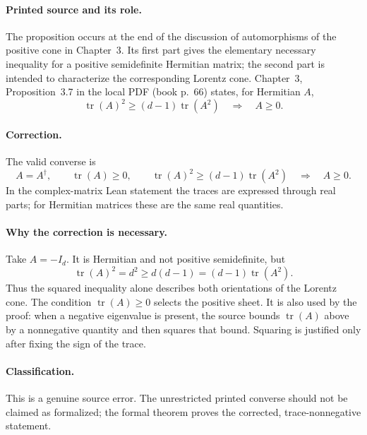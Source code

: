 \documentclass{article}
\begin{document}
\paragraph{Printed source and its role.}
The proposition occurs at the end of the discussion of automorphisms of the
positive cone in Chapter~3.  Its first part gives the elementary necessary
inequality for a positive semidefinite Hermitian matrix; the second part is
intended to characterize the corresponding Lorentz cone.  Chapter~3,
Proposition~3.7 in the local PDF (book p.~66) states, for Hermitian $A$,
\begin{equation}\tag{printed converse}
  \operatorname{tr}(A)^2\geq(d-1)\operatorname{tr}(A^2)
  \quad\Longrightarrow\quad A\geq0.
\end{equation}

\paragraph{Correction.}
The valid converse is
\begin{equation}\tag{formalized converse}
  A=A^\dagger,\qquad
  \operatorname{tr}(A)\geq0,\qquad
  \operatorname{tr}(A)^2\geq(d-1)\operatorname{tr}(A^2)
  \quad\Longrightarrow\quad A\geq0.
\end{equation}
In the complex-matrix Lean statement the traces are expressed through real
parts; for Hermitian matrices these are the same real quantities.

\paragraph{Why the correction is necessary.}
Take $A=-I_d$. It is Hermitian and not positive semidefinite, but
\begin{equation}
  \operatorname{tr}(A)^2=d^2
  \geq d(d-1)=(d-1)\operatorname{tr}(A^2).
\end{equation}
Thus the squared inequality alone describes both orientations of the Lorentz
cone. The condition $\operatorname{tr}(A)\geq0$ selects the positive sheet.
It is also used by the proof: when a negative eigenvalue is present, the source
bounds $\operatorname{tr}(A)$ above by a nonnegative quantity and then squares
that bound. Squaring is justified only after fixing the sign of the trace.

\paragraph{Classification.}
This is a genuine source error. The unrestricted printed converse should not
be claimed as formalized; the formal theorem proves the corrected,
trace-nonnegative statement.
\end{document}

